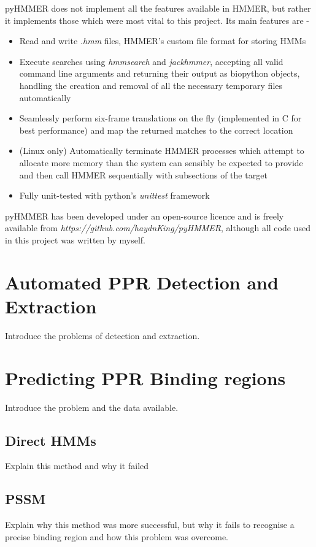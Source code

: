 pyHMMER does not implement all the features available in HMMER, but rather it
implements those which were most vital to this project.
Its main features are -
\begin{itemize}
  \item Read and write \emph{.hmm} files, HMMER's custom file format for
    storing HMMs
  \item Execute searches using 
    \emph{hmmsearch} and \emph{jackhmmer}, accepting all valid command line
    arguments and returning their output as biopython objects, 
    handling the creation and removal of all the necessary 
    temporary files automatically
  \item Seamlessly perform six-frame translations on the fly (implemented in C
    for best performance)
    and map the returned matches to the correct location
  \item (Linux only) 
    Automatically terminate HMMER processes which attempt to allocate more
    memory than the system can sensibly be expected to provide and then call
    HMMER sequentially with subsections of the target
  \item Fully unit-tested with python's \emph{unittest} framework
\end{itemize}
pyHMMER has been developed under an open-source licence and is freely available
from \emph{https://github.com/haydnKing/pyHMMER}, although all code used in
this project was written by myself.


\section{Automated PPR Detection and Extraction}
\label{sec:ppr_extraction}

Introduce the problems of detection and extraction.



\section{Predicting PPR Binding regions}
\label{sec:ppr_binding_prediction}

Introduce the problem and the data available.

\subsection{Direct HMMs}
\label{sec:hmm_binding}

Explain this method and why it failed

\subsection{PSSM}
\label{sec:pssm_binding}

Explain why this method was more successful, but why it fails to recognise a
precise binding region and how this problem was overcome.


